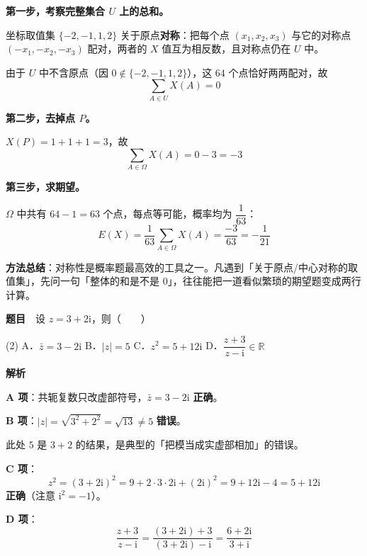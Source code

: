 \textbf{第一步，考察完整集合 $U$ 上的总和。}

坐标取值集 $\{-2,-1,1,2\}$ 关于原点\textbf{对称}：把每个点 $(x_1,x_2,x_3)$ 与它的对称点 $(-x_1,-x_2,-x_3)$ 配对，两者的 $X$ 值互为相反数，且对称点仍在 $U$ 中。

由于 $U$ 中不含原点（因 $0\notin\{-2,-1,1,2\}$），这 $64$ 个点恰好两两配对，故
\[\sum_{A\in U}X(A)=0\]

\textbf{第二步，去掉点 $P$。}

$X(P)=1+1+1=3$，故
\[\sum_{A\in\Omega}X(A)=0-3=-3\]

\textbf{第三步，求期望。}

$\Omega$ 中共有 $64-1=63$ 个点，每点等可能，概率均为 $\dfrac1{63}$：
\[E(X)=\frac{1}{63}\sum_{A\in\Omega}X(A)=\frac{-3}{63}=-\frac{1}{21}\]


\begin{gktip}
\textbf{方法总结}：对称性是概率题最高效的工具之一。凡遇到「关于原点/中心对称的取值集」，先问一句「整体的和是不是 $0$」，往往能把一道看似繁琐的期望题变成两行计算。
\end{gktip}

\par\medskip



\textbf{题目}　设 $z=3+2\mathrm{i}$，则（　　）

\begin{gkopts}(2)
\task A．$\bar z=3-2\mathrm{i}$
\task B．$|z|=5$
\task C．$z^2=5+12\mathrm{i}$
\task D．$\dfrac{z+3}{z-\mathrm{i}}\in\mathbb{R}$
\end{gkopts}

\textbf{解析}

\textbf{A 项}：共轭复数只改虚部符号，$\bar z=3-2\mathrm{i}$  \textbf{正确}。

\textbf{B 项}：$|z|=\sqrt{3^2+2^2}=\sqrt{13}\ne 5$  \textbf{错误}。

\begin{gktip}
此处 $5$ 是 $3+2$ 的结果，是典型的「把模当成实虚部相加」的错误。
\end{gktip}

\textbf{C 项}：
\[z^2=(3+2\mathrm{i})^2=9+2\cdot3\cdot2\mathrm{i}+(2\mathrm{i})^2=9+12\mathrm{i}-4=5+12\mathrm{i}\]
 \textbf{正确}（注意 $\mathrm{i}^2=-1$）。

\textbf{D 项}：
\[\frac{z+3}{z-\mathrm{i}}=\frac{(3+2\mathrm{i})+3}{(3+2\mathrm{i})-\mathrm{i}}=\frac{6+2\mathrm{i}}{3+\mathrm{i}}\]

